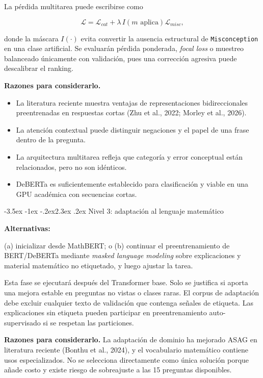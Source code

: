 \documentclass[11pt,oneside,openany]{book}
\makeatletter
\renewcommand\section{\@startsection{section}{1}{\z@}%
  {-3.5ex \@plus -1ex \@minus -.2ex}{2.3ex \@plus .2ex}%
  {\normalfont\Large\sffamily\bfseries\color{AzulMedio}}}
\newcommand{\codigo}[1]{\texttt{#1}}
\newcommand{\nivel}[1]{\textcolor{TurquesaOscuro}{\sffamily\bfseries #1}}
\makeatother
\begin{document}
La pérdida multitarea puede escribirse como

\[
\mathcal{L}=\mathcal{L}_{cat}+\lambda\,I(m\text{ aplica})\mathcal{L}_{misc},
\]

donde la máscara $I(\cdot)$ evita convertir la ausencia estructural de
\codigo{Misconception} en una clase artificial. Se evaluarán pérdida ponderada,
\emph{focal loss} o muestreo balanceado únicamente con validación, pues una
corrección agresiva puede descalibrar el ranking.

\textbf{Razones para considerarlo.}

\begin{itemize}
  \item La literatura reciente muestra ventajas de representaciones
  bidireccionales preentrenadas en respuestas cortas (Zhu et al., 2022; Morley et
  al., 2026).
  \item La atención contextual puede distinguir negaciones y el papel de una frase
  dentro de la pregunta.
  \item La arquitectura multitarea refleja que categoría y error conceptual están
  relacionados, pero no son idénticos.
  \item DeBERTa es suficientemente establecido para clasificación y viable en una
  GPU académica con secuencias cortas.
\end{itemize}

\section{Nivel 3: adaptación al lenguaje matemático}

\nivel{Alternativas:}\par (a) inicializar desde MathBERT; o (b) continuar el
preentrenamiento de BERT/DeBERTa mediante \emph{masked language modeling} sobre
explicaciones y material matemático no etiquetado, y luego ajustar la tarea.

Esta fase se ejecutará después del Transformer base. Solo se justifica si aporta
una mejora estable en preguntas no vistas o clases raras. El corpus de adaptación
debe excluir cualquier texto de validación que contenga señales de etiqueta. Las
explicaciones sin etiqueta pueden participar en preentrenamiento auto-supervisado
si se respetan las particiones.

\textbf{Razones para considerarlo.} La adaptación de dominio ha mejorado ASAG en
literatura reciente (Bonthu et al., 2024), y el vocabulario matemático contiene
usos especializados. No se selecciona directamente como única solución porque
añade costo y existe riesgo de sobreajuste a las 15 preguntas disponibles.
\end{document}
